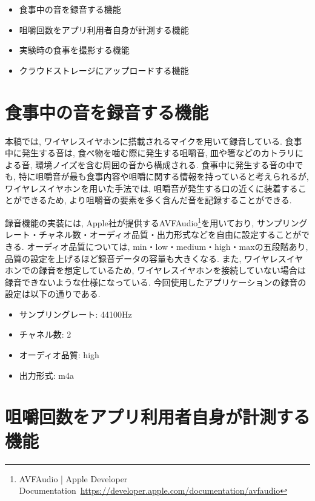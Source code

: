 \begin{itemize}
    \item 食事中の音を録音する機能
    \item 咀嚼回数をアプリ利用者自身が計測する機能
    \item 実験時の食事を撮影する機能
    \item クラウドストレージにアップロードする機能
\end{itemize}

\section{食事中の音を録音する機能}

本稿では, ワイヤレスイヤホンに搭載されるマイクを用いて録音している. 食事中に発生する音は, 食べ物を噛む際に発生する咀嚼音, 皿や箸などのカトラリによる音, 環境ノイズを含む周囲の音から構成される. 食事中に発生する音の中でも, 特に咀嚼音が最も食事内容や咀嚼に関する情報を持っていると考えられるが, ワイヤレスイヤホンを用いた手法では, 咀嚼音が発生する口の近くに装着することができるため, より咀嚼音の要素を多く含んだ音を記録することができる.

録音機能の実装には, Apple社が提供するAVFAudio\footnote{AVFAudio | Apple Developer Documentation~\url{https://developer.apple.com/documentation/avfaudio}}を用いており, サンプリングレート・チャネル数・オーディオ品質・出力形式などを自由に設定することができる. オーディオ品質については, min・low・medium・high・maxの五段階あり, 品質の設定を上げるほど録音データの容量も大きくなる. また, ワイヤレスイヤホンでの録音を想定しているため, ワイヤレスイヤホンを接続していない場合は録音できないような仕様になっている. 今回使用したアプリケーションの録音の設定は以下の通りである.

\begin{itemize}
    \item サンプリングレート: 44100Hz
    \item チャネル数: 2
    \item オーディオ品質: high
    \item 出力形式: m4a
\end{itemize}

\section{咀嚼回数をアプリ利用者自身が計測する機能}

